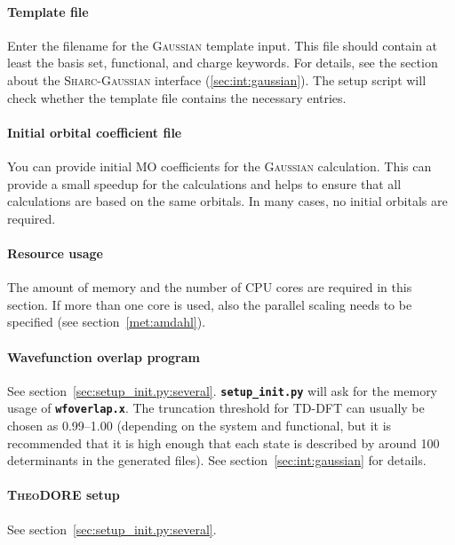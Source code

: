 \documentclass[a4paper,10pt,DIV=15,openany]{scrbook}
\newcommand{\sharc}{\textsc{Sharc}}
\newcommand{\ttt}[1]{\textbf{\texttt{#1}}}
\begin{document}
\paragraph{Template file}

Enter the filename for the \textsc{Gaussian} template input. This file should contain at least the basis set, functional, and charge keywords. For details, see the section about the \sharc-\textsc{Gaussian} interface (\ref{sec:int:gaussian}). The setup script will check whether the template file contains the necessary entries. 

\paragraph{Initial orbital coefficient file}

You can provide initial MO coefficients for the \textsc{Gaussian} calculation. This can provide a small speedup for the calculations and helps to ensure that all calculations are based on the same orbitals.
In many cases, no initial orbitals are required.

\paragraph{Resource usage}

The amount of memory and the number of CPU cores are required in this section. If more than one core is used, also the parallel scaling needs to be specified (see section~\ref{met:amdahl}).

\paragraph{Wavefunction overlap program}

See section~\ref{sec:setup_init.py:several}. \ttt{setup\_init.py} will ask for the memory usage of \ttt{wfoverlap.x}. The truncation threshold for TD-DFT can usually be chosen as 0.99--1.00 (depending on the system and functional, but it is recommended that it is high enough that each state is described by around 100 determinants in the generated files). See section~\ref{sec:int:gaussian} for details.

\paragraph{\textsc{TheoDORE} setup}

See section~\ref{sec:setup_init.py:several}. 
\end{document}
